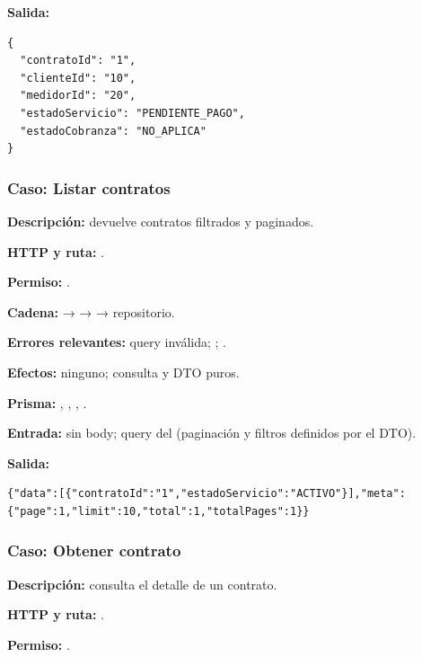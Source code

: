 \textbf{Salida:}


\begin{lstlisting}
{
  "contratoId": "1",
  "clienteId": "10",
  "medidorId": "20",
  "estadoServicio": "PENDIENTE_PAGO",
  "estadoCobranza": "NO_APLICA"
}
\end{lstlisting}


\subsubsection{Caso: Listar contratos}


\textbf{Descripción:} devuelve contratos filtrados y paginados.  

\textbf{HTTP y ruta:} \texttt{}.  

\textbf{Permiso:} \texttt{}.  

\textbf{Cadena:} \texttt{} → \texttt{} → \texttt{} → repositorio.  

\textbf{Errores relevantes:} \texttt{} query inválida; \texttt{}; \texttt{}.  

\textbf{Efectos:} ninguno; consulta y DTO puros.  

\textbf{Prisma:} \texttt{}, \texttt{}, \texttt{}, \texttt{}.  

\textbf{Entrada:} sin body; query del \texttt{} (paginación y filtros definidos por el DTO).  

\textbf{Salida:}


\begin{lstlisting}
{"data":[{"contratoId":"1","estadoServicio":"ACTIVO"}],"meta":{"page":1,"limit":10,"total":1,"totalPages":1}}
\end{lstlisting}


\subsubsection{Caso: Obtener contrato}


\textbf{Descripción:} consulta el detalle de un contrato.  

\textbf{HTTP y ruta:} \texttt{}.  

\textbf{Permiso:} \texttt{}.  

